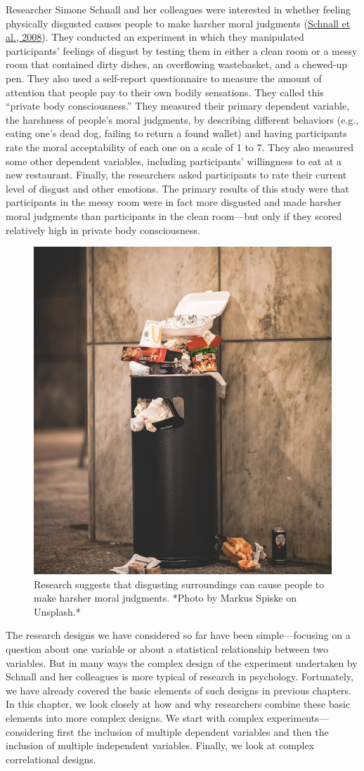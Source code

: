 \documentclass[
]{krantz}
\begin{document}
Researcher Simone Schnall and her colleagues were interested in whether feeling physically disgusted causes people to make harsher moral judgments (\protect\hyperlink{ref-schnall2008disgust}{Schnall et al., 2008}). They conducted an experiment in which they manipulated participants' feelings of disgust by testing them in either a clean room or a messy room that contained dirty dishes, an overflowing wastebasket, and a chewed-up pen. They also used a self-report questionnaire to measure the amount of attention that people pay to their own bodily sensations. They called this ``private body consciousness.'' They measured their primary dependent variable, the harshness of people's moral judgments, by describing different behaviors (e.g., eating one's dead dog, failing to return a found wallet) and having participants rate the moral acceptability of each one on a scale of 1 to 7. They also measured some other dependent variables, including participants' willingness to eat at a new restaurant. Finally, the researchers asked participants to rate their current level of disgust and other emotions. The primary results of this study were that participants in the messy room were in fact more disgusted and made harsher moral judgments than participants in the clean room---but only if they scored relatively high in private body consciousness.

\begin{figure}

{\centering \includegraphics[width=0.4\linewidth]{images/complex-designs/garbage} 

}

\caption{Research suggests that disgusting surroundings can cause people to make harsher moral judgments. *Photo by Markus Spiske on Unsplash.*}\label{fig:garbage}
\end{figure}

The research designs we have considered so far have been simple---focusing on a question about one variable or about a statistical relationship between two variables. But in many ways the complex design of the experiment undertaken by Schnall and her colleagues is more typical of research in psychology. Fortunately, we have already covered the basic elements of such designs in previous chapters. In this chapter, we look closely at how and why researchers combine these basic elements into more complex designs. We start with complex experiments---considering first the inclusion of multiple dependent variables and then the inclusion of multiple independent variables. Finally, we look at complex correlational designs.
\end{document}
